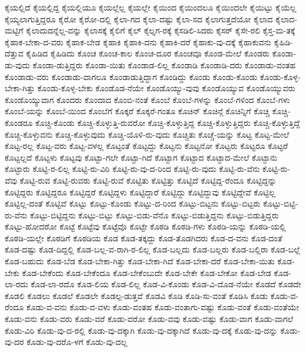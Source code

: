 {ಕೈಯಲ್ಲಿದೆ
ಕೈಯಲ್ಲಿದ್ದ
ಕೈಯಲ್ಲಿಯೂ
ಕೈಯಲ್ಲೆಲ್ಲ
ಕೈಯಲ್ಲೇ
ಕೈಯಿಂದ
ಕೈಯಿಂದಲೂ
ಕೈಯಿಂದಲೇ
ಕೈಯಿಟ್ಟು
ಕೈಯೆಲ್ಲ
ಕೈಯ್ಯಲಾಗುತ್ತಿದ್ದರೂ
ಕೈರೋ
ಕೈರೋ-ದಲ್ಲಿ
ಕೈಲಾ-ಗದ
ಕೈಲಾ-ದಷ್ಟು
ಕೈಲಾ-ಸದ
ಕೈಲಾಗುತ್ತದೆಯೋ
ಕೈಲಾದ
ಕೈಲಾದ-ಮಟ್ಟಿಗೆ
ಕೈಲಾದುದನ್ನೆಲ್ಲ-ವನ್ನು
ಕೈಲಾಸಕ್ಕೆ
ಕೈಲಿಗೆ
ಕೈಲ್
ಕೈಲ್ನಗ-ರಕ್ಕೆ
ಕೈಸಡಿಲಿ-ಸಿದರು
ಕೈಸರ್
ಕೈಸೇ-ರಲಿ
ಕೈಸ್ತ-ಮ-ತಕ್ಕೆ
ಕೈಹಾಕ-ಬೇಕಾ-ದ-ವರು
ಕೈಹಾಕ-ಬೇಡ
ಕೈಹಾಕಿ
ಕೈಹಾಕಿ-ದನು
ಕೈಹಾಕಿ-ದರೆ
ಕೈಹಾಕು-ವು-ದಕ್ಕೆ
ಕೈಹಾಕುವನು
ಕೈಹಿಡಿ-ದೆತ್ತುವ
ಕೈಹಿಡಿದ
ಕೈಹಿಡಿದು
ಕೊಂಚ
ಕೊಂಚ-ಕಾಲ
ಕೊಂಚ-ದೂರ
ಕೊಂಚವೂ
ಕೊಂಡ-ಮೇಲೆ
ಕೊಂಡರು
ಕೊಂಡಾ-ಡು-ವುದು
ಕೊಂಡಾ-ಡುತ್ತಿದ್ದರು
ಕೊಂಡಾ-ಯಿತು
ಕೊಂಡಾಡ-ಲಿಲ್ಲ
ಕೊಂಡಾಡಿ
ಕೊಂಡಾಡಿ-ದರು
ಕೊಂಡಾಡು-ವಂತಹ
ಕೊಂಡಾಡು-ವರು
ಕೊಂಡಾಡು-ವಾಗಲೂ
ಕೊಂಡಾಡುತ್ತಿದ್ದಾಗ
ಕೊಂಡಿದ್ದು
ಕೊಂಡು
ಕೊಂಡು-ಕೊಂಡು
ಕೊಂಡು-ಕೊಳ್ಳ-ಬೇಕಾ-ಗಿತ್ತು
ಕೊಂಡು-ಕೊಳ್ಳ-ಬೇಕು
ಕೊಂಡೊಡ-ನೆಯೇ
ಕೊಂಡೊಯ್ಯು-ವುವು
ಕೊಂಡೊಯ್ಯುವ
ಕೊಂಡೊಯ್ಯುವರು
ಕೊಂಡೊಯ್ಯುವಾಗ
ಕೊಂದರು
ಕೊಂದಾದ
ಕೊಂಬಿ-ನಂತೆ
ಕೊಂಬೆ
ಕೊಂಬೆ-ಗಳನ್ನು
ಕೊಂಬೆ-ಗಳಿಂದ
ಕೊಂಬೆ-ಗಳು
ಕೊಂಬೆ-ಯನ್ನು
ಕೊಂಬೆ-ಯಿಂದ
ಕೊಂಬೆಗೆ
ಕೊಕ್ಕರೆ
ಕೊಕ್ಕರೆ-ಗಂತೂ
ಕೊಚಿನ್
ಕೊಚಿನ್ಗೆ
ಕೊಚಿನ್ನಿಗೆ
ಕೊಚ್ಚಿ
ಕೊಚ್ಚಿ-ಕೊಂಡರೂ
ಕೊಚ್ಚಿ-ಕೊಂಡು
ಕೊಚ್ಚಿ-ಕೊಳ್ಳುತ್ತಿ-ರುವರೋ
ಕೊಚ್ಚಿ-ಕೊಳ್ಳುತ್ತಿದ್ದ
ಕೊಚ್ಚಿ-ಕೊಳ್ಳುತ್ತಿದ್ದರು
ಕೊಚ್ಚಿ-ಕೊಳ್ಳುತ್ತಿದ್ದೆ
ಕೊಚ್ಚಿ-ಕೊಳ್ಳುವನು
ಕೊಚ್ಚಿ-ಕೊಳ್ಳುವುದು
ಕೊಚ್ಚಿ-ಯೊಳಿ-ರು-ವುದು
ಕೊಚ್ಚಿತು
ಕೊಚ್ಚೆ-ಯನ್ನು
ಕೊಟ್ಟ
ಕೊಟ್ಟ-ಮೇಲೆ
ಕೊಟ್ಟ-ರಲ್ಲ
ಕೊಟ್ಟ-ವರು
ಕೊಟ್ಟ-ವಳಲ್ಲ
ಕೊಟ್ಟಂತೆ
ಕೊಟ್ಟದ್ದು
ಕೊಟ್ಟನು
ಕೊಟ್ಟನೋ
ಕೊಟ್ಟರು
ಕೊಟ್ಟರೂ
ಕೊಟ್ಟರೆ
ಕೊಟ್ಟಲ್ಲದೆ
ಕೊಟ್ಟಳು
ಕೊಟ್ಟವು
ಕೊಟ್ಟಾ-ಗಲೇ
ಕೊಟ್ಟಾ-ಗಿದೆ
ಕೊಟ್ಟಾಗ
ಕೊಟ್ಟಾದ
ಕೊಟ್ಟಾದ-ಮೇಲೆ
ಕೊಟ್ಟಾನು
ಕೊಟ್ಟಾರು
ಕೊಟ್ಟಿ-ರ-ಲಿಲ್ಲ
ಕೊಟ್ಟಿ-ರು-ವಿರಿ
ಕೊಟ್ಟಿ-ರು-ವು-ದ-ರಿಂದ
ಕೊಟ್ಟಿ-ರು-ವುದು
ಕೊಟ್ಟಿ-ರು-ವೆನು
ಕೊಟ್ಟಿ-ರು-ವೆವು
ಕೊಟ್ಟಿ-ರುವ
ಕೊಟ್ಟಿ-ರುವರು
ಕೊಟ್ಟಿ-ರುವೆ
ಕೊಟ್ಟಿತು
ಕೊಟ್ಟಿತ್ತು
ಕೊಟ್ಟಿದೆ
ಕೊಟ್ಟಿದ್ದ-ರೆಂದೂ
ಕೊಟ್ಟಿದ್ದನ್ನು
ಕೊಟ್ಟಿದ್ದರು
ಕೊಟ್ಟಿದ್ದರೂ
ಕೊಟ್ಟಿದ್ದರೆ
ಕೊಟ್ಟಿದ್ದಳು
ಕೊಟ್ಟಿದ್ದಾರೆ
ಕೊಟ್ಟಿದ್ದು
ಕೊಟ್ಟಿದ್ದುವು
ಕೊಟ್ಟಿದ್ದೇವೆ
ಕೊಟ್ಟಿಲ್ಲ
ಕೊಟ್ಟಿಲ್ಲ-ದಂತೆ
ಕೊಟ್ಟಿವೆ
ಕೊಟ್ಟು
ಕೊಟ್ಟು-ಕೊಂಡು
ಕೊಟ್ಟು-ದ-ರಿಂದ
ಕೊಟ್ಟು-ಬಿಟ್ಟನು
ಕೊಟ್ಟು-ಬಿಟ್ಟರು
ಕೊಟ್ಟು-ಬಿಟ್ಟಿ-ರು-ವೆನು
ಕೊಟ್ಟು-ಬಿಟ್ಟಿದ್ದನು
ಕೊಟ್ಟು-ಬಿಟ್ಟು
ಕೊಟ್ಟು-ಬಿಡು-ವೆನೊ
ಕೊಟ್ಟು-ಬಿಡುತ್ತಿದ್ದನು
ಕೊಟ್ಟು-ಬಿಡುತ್ತಿದ್ದರು
ಕೊಟ್ಟು-ಹೋದರೋ
ಕೊಟ್ಟೆ
ಕೊಟ್ಟೆವು
ಕೊಟ್ಟೆವೊ
ಕೊಟ್ಟೇ
ಕೊಠಡಿ
ಕೊಠಡಿ-ಗಳು
ಕೊಠಡಿ-ಯನ್ನು
ಕೊಠಡಿ-ಯಲ್ಲಿ
ಕೊಠಡಿ-ಯಲ್ಲೇ
ಕೊಠಡಿಗೆ
ಕೊಠಡಿಯ
ಕೊಡ
ಕೊಡ-ತಕ್ಕದ್ದು
ಕೊಡ-ತೊಡಗಿದರು
ಕೊಡ-ದ-ವನು
ಕೊಡ-ದಂತೆ
ಕೊಡ-ದಷ್ಟು
ಕೊಡ-ದಿದ್ದಲ್ಲಿ
ಕೊಡ-ಬಲ್ಲ-ವ-ರಾಗಿ-ರ-ಲಿಲ್ಲ
ಕೊಡ-ಬಲ್ಲದು
ಕೊಡ-ಬಲ್ಲರು
ಕೊಡ-ಬಲ್ಲಿರಾ
ಕೊಡ-ಬಲ್ಲೆ
ಕೊಡ-ಬಹುದು
ಕೊಡ-ಬೆಡ
ಕೊಡ-ಬೇಕಾ-ಗಿತ್ತು
ಕೊಡ-ಬೇಕಾ-ಗಿದೆ
ಕೊಡ-ಬೇಕಾ-ದರೆ
ಕೊಡ-ಬೇಕಾ-ಯಿತು
ಕೊಡ-ಬೇಕು
ಕೊಡ-ಬೇಕೆಂದು
ಕೊಡ-ಬೇಕೆಂದೂ
ಕೊಡ-ಬೇಕೆಂಬುದೇ
ಕೊಡ-ಬೇಕೇ
ಕೊಡ-ಬೇಕೋ
ಕೊಡ-ಬೇಡ
ಕೊಡ-ಲಾ-ರದು
ಕೊಡ-ಲಾ-ರದೊ
ಕೊಡ-ಲಿಯ
ಕೊಡ-ಲಿಲ್ಲ
ಕೊಡ-ವಿ-ಕೊಂಡು
ಕೊಡ-ವಿ-ದೊಡ-ನೆಯೇ
ಕೊಡದೆ
ಕೊಡದೇ
ಕೊಡಲಿ
ಕೊಡಲು
ಕೊಡಲೆ
ಕೊಡಲೇ
ಕೊಡಲ್ಪ-ಡುತ್ತವೆ
ಕೊಡವಿ
ಕೊಡಿ
ಕೊಡಿ-ಸು-ವಂತೆ
ಕೊಡಿಸಿ
ಕೊಡು
ಕೊಡು-ವ-ರೆಂದೂ
ಕೊಡು-ವ-ವನು
ಕೊಡು-ವ-ವಳು
ಕೊಡು-ವಂತಹ
ಕೊಡು-ವಂತಾಗು-ವಷ್ಟು
ಕೊಡು-ವಂತೆ
ಕೊಡು-ವಂತೆಯೇ
ಕೊಡು-ವನು
ಕೊಡು-ವರು
ಕೊಡು-ವರೆ
ಕೊಡು-ವರೋ
ಕೊಡು-ವವು
ಕೊಡು-ವಷ್ಟು
ಕೊಡು-ವಾಗ
ಕೊಡು-ವಾಗಲೆ
ಕೊಡು-ವಿರಿ
ಕೊಡು-ವು-ದ-ರಲ್ಲಿ
ಕೊಡು-ವು-ದಕ್ಕಾಗಿ
ಕೊಡು-ವು-ದಕ್ಕಾಗಿದೆ
ಕೊಡು-ವು-ದಕ್ಕೆ
ಕೊಡು-ವು-ದನ್ನು
ಕೊಡು-ವು-ದರ
ಕೊಡು-ವು-ದರೊ-ಳಗೆ
ಕೊಡು-ವು-ದಲ್ಲ
}
